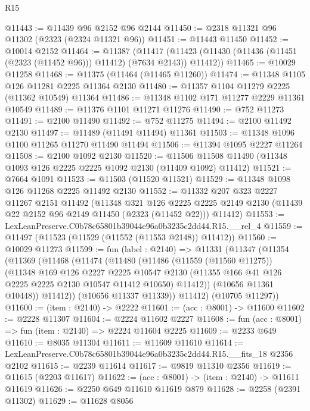 \begin{lexlean}{R15}
\begin{coremodule}
@11443 := @11439 @96 @2152 @96 @2144
@11450 := @2318 @11321 @96 @11302 (@2323 (@2324 @11321 @96))
@11451 := @11443 @11450
@11452 := @10014 @2152
@11464 := @11387
    (@11417 (@11423 (@11430 (@11436 (@11451 (@2323 (@11452 @96))) @11412) (@7634 @2143)) @11412))
@11465 := @10029 @11258
@11468 := @11375 (@11464 (@11465 @11260))
@11474 := @11348 @1105 @126 @11281 @2225 @11364 @2130
@11480 := @11357 @1104 @11279 @2225 (@11362 @10549) @11364
@11486 := @11348 @1102 @171 @11277 @2229 @11361 @10549
@11489 := @11376 @1101 @11271 @11276
@11490 := @752 @11273
@11491 := @2100 @11490
@11492 := @752 @11275
@11494 := @2100 @11492 @2130
@11497 := @11489 (@11491 @11494) @11361
@11503 := @11348 @1096 @1100 @11265 @11270 @11490 @11494
@11506 := @11394 @1095 @2227 @11264
@11508 := @2100 @1092 @2130
@11520 := @11506 @11508 @11490 (@11348 @1093 @126 @2225 @2225 @1092 @2130 (@11409 @1092) @11412)
@11521 := @7664 @1091
@11523 := @11503 (@11520 @11521)
@11529 := @11348 @1098 @126 @11268 @2225 @11492 @2130
@11552 := @11332
    @207
    @323
    @2227
    @11267
    @2151
    @11492
    (@11348
      @321
      @126
      @2225
      @2225
      @2149
      @2130
      (@11439 @22 @2152 @96 @2149 @11450 (@2323 (@11452 @22)))
      @11412)
@11553 := LexLeanPreserve.C0b78c65801b39044e96a0b3235c2dd44.R15.__rel_4
@11559 := @11497 (@11523 (@11529 (@11552 (@11553 @2148)) @11412))
@11560 := @10029 @11273
@11599 := fun (label : @2140) =>
  @11331
    (@11347
      (@11354
        (@11369
          (@11468
            (@11474
              (@11480
                (@11486
                  (@11559 (@11560 @11275))
                  (@11348
                    @169
                    @126
                    @2227
                    @2225
                    @10547
                    @2130
                    (@11355 @166 @41 @126 @2225 @2225 @2130 @10547 @11412 @10650)
                    @11412))
                (@10656 @11361 @10448))
              @11412))
          (@10656 @11337 @11339))
        @11412)
      (@10705 @11297))
@11600 := (item : @2140) -> @2222
@11601 := (acc : @8001) -> @11600
@11602 := @2228 @11307
@11604 := @2224 @11602 @2227
@11608 := fun (acc : @8001) => fun (item : @2140) => @2224 @11604 @2225
@11609 := @2233 @649
@11610 := @8035 @11304
@11611 := @11609 @11610
@11614 := LexLeanPreserve.C0b78c65801b39044e96a0b3235c2dd44.R15.__fits_18 @2356 @2102
@11615 := @2239 @11614
@11617 := @9819 @11310 @2356
@11619 := @11615 (@2203 @11617)
@11622 := (acc : @8001) -> (item : @2140) -> @11611 @11619
@11626 := @2250 @649 @11610 @11619 @879
@11628 := @2258 (@2391 @11302)
@11629 := @11628 @8056

\end{coremodule}
\end{lexlean}
